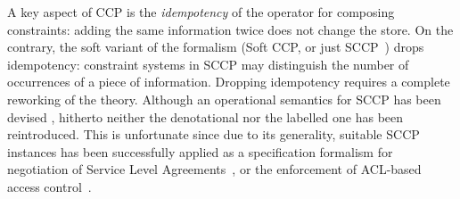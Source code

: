 \documentclass[main.tex]{subfiles}
\begin{document}
A key aspect of CCP is the \emph{idempotency} of the operator for composing constraints:
adding the same information twice does not change the store. 
%
On the contrary, the soft variant of the formalism (Soft CCP, or just SCCP~\cite{scc}) drops idempotency: 
constraint systems in SCCP may distinguish the number of occurrences of a  
piece of information.
%
Dropping idempotency requires a complete reworking of the theory. Although an operational semantics for SCCP has been devised \cite{scc}, hitherto 
neither the denotational nor the labelled one has been reintroduced. 
%
This is unfortunate since due to its generality, suitable SCCP instances has been successfully applied as a specification formalism for 
negotiation of Service Level Agreements~\cite{ccpi}, or the enforcement of ACL-based access control~\cite{sefm12,fun14}. 

%



%
%
%
%
%
\end{document}
